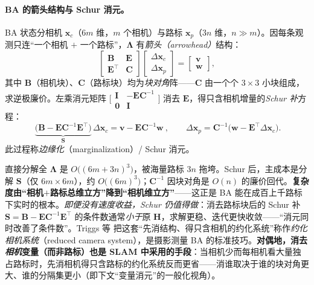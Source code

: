 \paragraph{BA 的箭头结构与 Schur 消元。}\cite{gaoxiang2019slam14}
BA 状态分相机 $\mathbf{x}_c$（$6m$ 维，$m$ 个相机）与路标 $\mathbf{x}_p$（$3n$ 维，$n\gg m$）。因每条观测只连“一个相机 $+$ 一个路标”，$\boldsymbol{\Lambda}$ 有\emph{箭头（arrowhead）}结构：
\begin{equation}
  \begin{bmatrix}\mathbf{B}&\mathbf{E}\\\mathbf{E}^\top&\mathbf{C}\end{bmatrix}
  \begin{bmatrix}\Delta\mathbf{x}_c\\\Delta\mathbf{x}_p\end{bmatrix}
  =\begin{bmatrix}\mathbf{v}\\\mathbf{w}\end{bmatrix},
  \label{eq:ba-block}
\end{equation}
其中 $\mathbf{B}$（相机块）、$\mathbf{C}$（路标块）均为\emph{块对角}阵——$\mathbf{C}$ 由一个个 $3\times3$ 小块组成，求逆极廉价。左乘消元矩阵 $\big[\begin{smallmatrix}\mathbf{I}&-\mathbf{E}\mathbf{C}^{-1}\\\mathbf{0}&\mathbf{I}\end{smallmatrix}\big]$ 消去 $\mathbf{E}$，得只含相机增量的\emph{Schur 补}方程：
\begin{equation}
  \boxed{\ \underbrace{\big(\mathbf{B}-\mathbf{E}\mathbf{C}^{-1}\mathbf{E}^\top\big)}_{\textstyle\mathbf{S}}\,\Delta\mathbf{x}_c=\mathbf{v}-\mathbf{E}\mathbf{C}^{-1}\mathbf{w}\ },\qquad
  \Delta\mathbf{x}_p=\mathbf{C}^{-1}\big(\mathbf{w}-\mathbf{E}^\top\Delta\mathbf{x}_c\big).
  \label{eq:schur}
\end{equation}
此过程称\emph{边缘化}（marginalization）/ Schur 消元\cite{gaoxiang2019slam14}。

\begin{insight}
直接分解全 $\boldsymbol{\Lambda}$ 是 $O\big((6m+3n)^3\big)$，被海量路标 $3n$ 拖垮。Schur 后，主成本是分解 $\mathbf{S}$（仅 $6m\times6m$），约 $O\big((6m)^3\big)$；$\mathbf{C}^{-1}$ 因块对角是 $O(n)$ 的廉价回代。\textbf{复杂度由“相机$+$路标总维立方”降到“相机维立方”}——这正是 BA 能在成百上千路标下实时的根本。\emph{即便没有速度收益，Schur 仍值得做}：消去路标块后的 Schur 补 $\mathbf{S}=\mathbf{B}-\mathbf{E}\mathbf{C}^{-1}\mathbf{E}^\top$ 的条件数通常\emph{小于}原 $\mathbf{H}$\cite{gaoxiang2019slam14}，求解更稳、迭代更快收敛——“消元同时改善了条件数”。Triggs 等\cite{triggs2000ba} 把这套“先消结构、得只含相机的约化系统”称作\emph{约化相机系统}（reduced camera system），是摄影测量 BA 的标准技巧。\textbf{对偶地，消去\emph{相机}变量（而非路标）也是 SLAM 中采用的手段}：当相机少而每相机看大量独占路标时，先消相机得只含路标的约化系统反而更省——消谁取决于谁的块对角更大、谁的分隔集更小（即下文“变量消元”的一般化视角）。
\end{insight}

